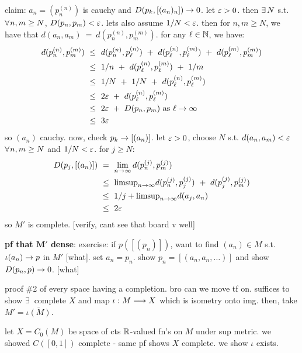 claim: $a_{n}=(p_{n}^{(n)})$ is cauchy and $D(p_{k},[(a_{n})_{n}])\rightarrow0$.
let $\varepsilon>0$. then $\ex N$ s.t. $\fa n,m\geq N$, $D(p_{n},p_{m})<\varepsilon$.
lets also assume $1/N<\varepsilon$. then for $n,m\geq N$, we have that
$d(a_{n},a_{m}) \ = \ d(p_{n}^{(n)},p_{m}^{(m)})$.
for any $\ell\in\mathbb{N}$, we have:
\begin{align*}
	d(p_{n}^{(n)},p_{m}^{(m)}) & \ \leq \
	d(p_{n}^{(n)},p_{\ell}^{(n)}) \ + \ d(p_{\ell}^{(n)},p_{\ell}^{(m)})
	\ + \ d(p_{\ell}^{(m)},p_{m}^{(m)}) \\
	& \ \leq \ 1/n \ + \ d(p_{\ell}^{(n)},p_{\ell}^{(m)}) \ + \ 1/m \\
	& \ \leq \ 1/N \ + \ 1/N \ + \ d(p_{\ell}^{(n)},p_{\ell}^{(m)}) \\
	& \ \leq \ 2\varepsilon \ + \ d(p_{\ell}^{(n)},p_{\ell}^{(m)}) \\
	& \ \leq \ 2\varepsilon \ + \ D(p_{n},p_{m}) \textrm{ as } \ell \rightarrow \infty \\
	& \ \leq \ 3\varepsilon
\end{align*}
so $(a_{n})$ cauchy. now, check $p_{k}\rightarrow[(a_{n})]$.
let $\varepsilon>0$, choose $N$ s.t. $d(a_{n},a_{m})<\varepsilon$ $\fa n,m\geq N$ and $1/N<\varepsilon$.
for $j\geq N$:
\begin{align*}
	D(p_{j},[(a_{n})]) & \ = \ \lim_{n\sto\infty}d(p_{n}^{(j)},p_{m}^{(j)}) \\
	& \ \leq \ \trm{limsup}_{n\sto\infty}
	d(p_{n}^{(j)},p_{j}^{(j)}) \ + \ d(p_{j}^{(j)},p_{m}^{(j)}) \\
	& \ \leq \ 1/j + \trm{limsup}_{n\sto\infty}d(a_{j},a_{n}) \\
	& \ \leq \ 2\ep
\end{align*}
so $M'$ is complete. [verify, cant see that board v well]

\textbf{pf that $\bm{M'}$ dense}:
exercise: if $p([(p_{n})])$, want to find $(a_{n})\in M$ s.t. $\iota(a_{n})\rightarrow p$
in $M'$ [what].
set $a_{n}=p_{n}$. show $p_{n}=[(a_{n},a_{n},\dots)]$ and show $D(p_{n},p)\rightarrow0$.
[what]

proof \#2 of every space having a completion. bro can we move tf on.
suffices to show $\ex$ complete $X$ and map $\iota:M\longrightarrow X$ which is isometry onto img.
then, take $M'=\bar{\iota(M)}$.

let $X=C_{0}(M)$ be space of cts $\mathbb{R}$-valued fn's on $M$ under sup metric.
we showed $C([0,1])$ complete - same pf shows $X$ complete.
we show $\iota$ exists.

